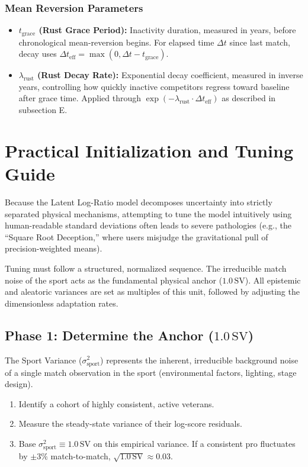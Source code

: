 \documentclass[12pt]{article}
\begin{document}
	\subsubsection*{Mean Reversion Parameters}
	\begin{itemize}
		\item \textbf{$t_{\mathrm{grace}}$ (Rust Grace Period):} Inactivity duration, measured in years, before chronological mean-reversion begins. For elapsed time $\Delta t$ since last match, decay uses $\Delta t_{\mathrm{eff}} = \max(0, \Delta t - t_{\mathrm{grace}})$.
		\item \textbf{$\lambda_{\mathrm{rust}}$ (Rust Decay Rate):} Exponential decay coefficient, measured in inverse years, controlling how quickly inactive competitors regress toward baseline after grace time. Applied through $\exp(-\lambda_{\mathrm{rust}} \cdot \Delta t_{\mathrm{eff}})$ as described in subsection E.
	\end{itemize}

	\section{Practical Initialization and Tuning Guide}
	\label{app:tuning}

	Because the Latent Log-Ratio model decomposes uncertainty into strictly separated physical mechanisms, attempting to tune the model intuitively using human-readable standard deviations often leads to severe pathologies (e.g., the ``Square Root Deception,'' where users misjudge the gravitational pull of precision-weighted means).

	Tuning must follow a structured, normalized sequence. The irreducible match noise of the sport acts as the fundamental physical anchor ($1.0\,\mathrm{SV}$). All epistemic and aleatoric variances are set as multiples of this unit, followed by adjusting the dimensionless adaptation rates.

	\subsection{Phase 1: Determine the Anchor ($1.0\,\mathrm{SV}$)}
	The Sport Variance ($\sigma_{\mathrm{sport}}^2$) represents the inherent, irreducible background noise of a single match observation in the sport (environmental factors, lighting, stage design).
	\begin{enumerate}
		\item Identify a cohort of highly consistent, active veterans.
		\item Measure the steady-state variance of their log-score residuals.
		\item Base $\sigma_{\mathrm{sport}}^2 \equiv 1.0\,\mathrm{SV}$ on this empirical variance. If a consistent pro fluctuates by $\pm 3\%$ match-to-match, $\sqrt{1.0\,\mathrm{SV}} \approx 0.03$.
	\end{enumerate}
\end{document}
